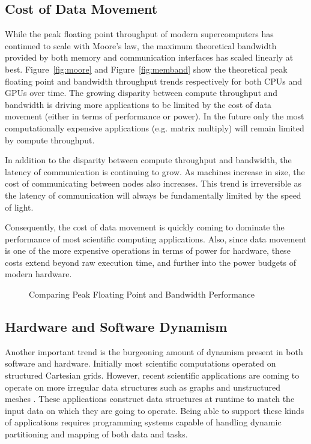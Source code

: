 \subsection{Cost of Data Movement}
\label{subsec:movement}

While the peak floating point throughput of modern supercomputers
has continued to scale with Moore's law, the maximum
theoretical bandwidth provided by both memory and communication
interfaces has scaled linearly at best. Figure~\ref{fig:moore}
and Figure~\ref{fig:memband} \cite{CUDA} show the theoretical 
peak floating point and bandwidth throughput trends respectively
for both CPUs and GPUs over time. The growing disparity between
compute throughput and bandwidth is driving more applications
to be limited by the cost of data movement (either in terms
of performance or power). In the future only the most computationally
expensive applications (e.g. matrix multiply) will remain 
limited by compute throughput.

In addition to the disparity between compute throughput and
bandwidth, the latency of communication is continuing to grow.
As machines increase in size, the cost of communicating 
between nodes also increases. This trend is irreversible as the
latency of communication will always be fundamentally limited 
by the speed of light.

Consequently, the cost of data movement is
quickly coming to dominate the performance of most 
scientific computing applications. Also, since data movement
is one of the more expensive operations in terms
of power for hardware, these costs extend beyond raw
execution time, and further into the power budgets of
modern hardware. 

\begin{figure}[ht]
\centering
{}
\caption{Comparing Peak Floating Point and Bandwidth Performance\cite{CUDA}\label{fig:peak}}
\end{figure}

\subsection{Hardware and Software Dynamism}
\label{subsec:dynamism}

Another important trend is the burgeoning amount of 
dynamism present in both software and hardware. Initially 
most scientific computations operated on structured
Cartesian grids. However, recent scientific 
applications are coming to operate on more irregular
data structures such as graphs \cite{Pennant13}
and unstructured meshes \cite{Liszt11}. These
applications construct data structures at runtime
to match the input data on which they are going to
operate. Being able to support these kinds of applications
requires programming systems capable of handling dynamic
partitioning and mapping of both data and tasks. 

